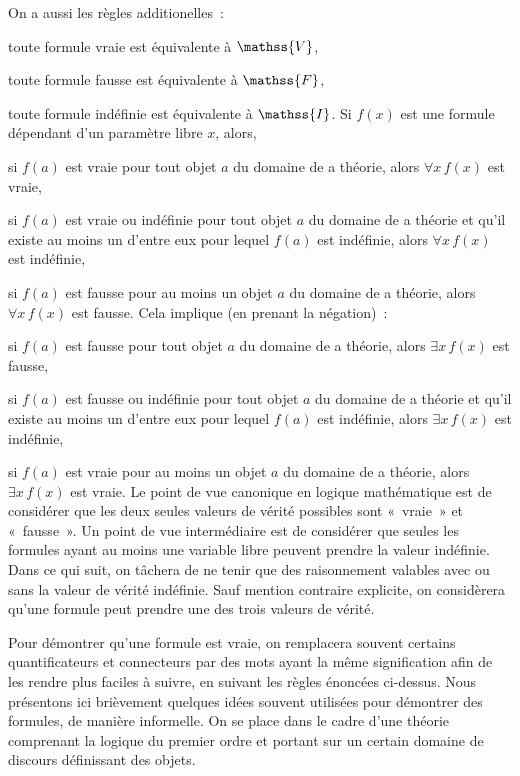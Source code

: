 \stopitemize
\blank[medium]
On a aussi les règles additionelles : 
\startitemize[nowhite]
  \item toute formule vraie est équivalente à $\mathss{V}$,
  \item toute formule fausse est équivalente à $\mathss{F}$,
  \item toute formule indéfinie est équivalente à $\mathss{I}$.
\stopitemize
\blank[medium]
Si $f(x)$ est une formule dépendant d'un paramètre libre $x$, alors, 
\startitemize[nowhite]
  \item si $f(a)$ est vraie pour tout objet $a$ du domaine de a théorie, alors $\forall x \, f(x)$ est vraie,
  \item si $f(a)$ est vraie ou indéfinie pour tout objet $a$ du domaine de a théorie et qu'il existe au moins un d'entre eux pour lequel $f(a)$ est indéfinie, alors $\forall x \, f(x)$ est indéfinie,
  \item si $f(a)$ est fausse pour au moins un objet $a$ du domaine de a théorie, alors $\forall x \, f(x)$ est fausse.
\stopitemize
Cela implique (en prenant la négation) : 
\startitemize[nowhite]
  \item si $f(a)$ est fausse pour tout objet $a$ du domaine de a théorie, alors $\exists x \, f(x)$ est fausse,
  \item si $f(a)$ est fausse ou indéfinie pour tout objet $a$ du domaine de a théorie et qu'il existe au moins un d'entre eux pour lequel $f(a)$ est indéfinie, alors $\exists x \, f(x)$ est indéfinie,
  \item si $f(a)$ est vraie pour au moins un objet $a$ du domaine de a théorie, alors $\exists x \, f(x)$ est vraie.
\stopitemize
\blank[medium]
Le point de vue canonique en logique mathématique est de considérer que les deux seules valeurs de vérité possibles sont « vraie » et « fausse ». 
Un point de vue intermédiaire est de considérer que seules les formules ayant au moins une variable libre peuvent prendre la valeur indéfinie. 
Dans ce qui suit, on tâchera de ne tenir que des raisonnement valables avec ou sans la valeur de vérité indéfinie. 
Sauf mention contraire explicite, on considèrera qu'une formule peut prendre une des trois valeurs de vérité.

\stopsubsection

\startsubsection[title=Quelques schémas de raisonnement]

Pour démontrer qu'une formule est vraie, on remplacera souvent certains quantificateurs et connecteurs par des mots ayant la même signification afin de les rendre plus faciles à suivre, en suivant les règles énoncées ci-dessus. 
Nous présentons ici brièvement quelques idées souvent utilisées pour démontrer des formules, de manière informelle. 
On se place dans le cadre d'une théorie comprenant la logique du premier ordre et portant sur un certain domaine de discours définissant des objets.

